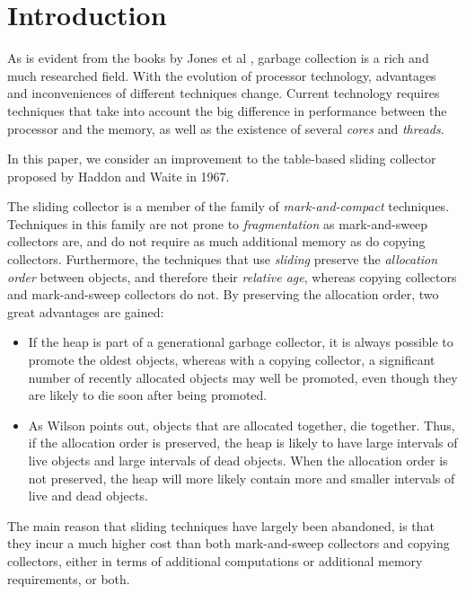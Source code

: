 \section{Introduction}

As is evident from the books by Jones et al
\cite{Jones:2011:GCH:2025255} \cite{Jones:1996:GCA:236254}, garbage
collection is a rich and much researched field.  With the evolution of
processor technology, advantages and inconveniences of different
techniques change.  Current technology requires techniques that take
into account the big difference in performance between the processor
and the memory, as well as the existence of several \emph{cores} and
\emph{threads}.

In this paper, we consider an improvement to the table-based sliding
collector proposed by Haddon and Waite \cite{Haddon:1967} in 1967.

The sliding collector is a member of the family of
\emph{mark-and-compact} techniques.  Techniques in this family are not
prone to \emph{fragmentation} as mark-and-sweep collectors are, and do
not require as much additional memory as do copying collectors.
Furthermore, the techniques that use \emph{sliding} preserve the
\emph{allocation order} between objects, and therefore their
\emph{relative age}, whereas copying collectors and mark-and-sweep
collectors do not.  By preserving the allocation order, two great
advantages are gained:

\begin{itemize}
\item If the heap is part of a generational garbage collector, it is
  always possible to promote the oldest objects, whereas with a
  copying collector, a significant number of recently allocated 
  objects may well be promoted, even though they are likely to die
  soon after being promoted. 
\item As Wilson \cite{Wilson:1992:UGC:645648.664824} points out,
  objects that are allocated together, die together.  Thus, if the
  allocation order is preserved, the heap is likely to have
  large intervals of live objects and large intervals of dead
  objects.  When the allocation order is not preserved, the heap will
  more likely contain more and smaller intervals of live and dead
  objects. 
\end{itemize}

The main reason that sliding techniques have largely been abandoned,
is that they incur a much higher cost than both mark-and-sweep
collectors and copying collectors, either in terms of additional
computations or additional memory requirements, or both. 
